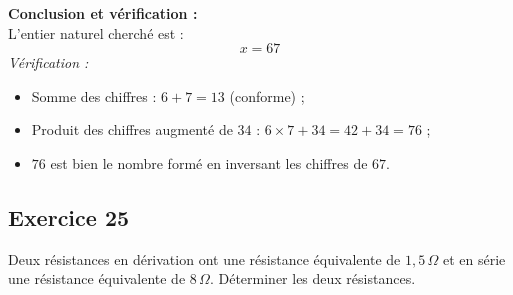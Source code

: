 \documentclass[11pt,a4paper]{article}
\begin{document}
\begin{correctionbox}
\textbf{Conclusion et vérification :}\\
L'entier naturel cherché est :
\[
\boxed{x = 67}
\]
\textit{Vérification :}
\begin{itemize}[leftmargin=*,label=\textbullet]
    \item Somme des chiffres : $6 + 7 = 13$ (conforme) ;
    \item Produit des chiffres augmenté de $34$ : $6 \times 7 + 34 = 42 + 34 = 76$ ;
    \item $76$ est bien le nombre formé en inversant les chiffres de $67$.
\end{itemize}
\end{correctionbox}

\subsection*{Exercice 25}
Deux résistances en dérivation ont une résistance équivalente de $1{,}5\,\Omega$ et en série une résistance équivalente de $8\,\Omega$. Déterminer les deux résistances.
\end{document}

